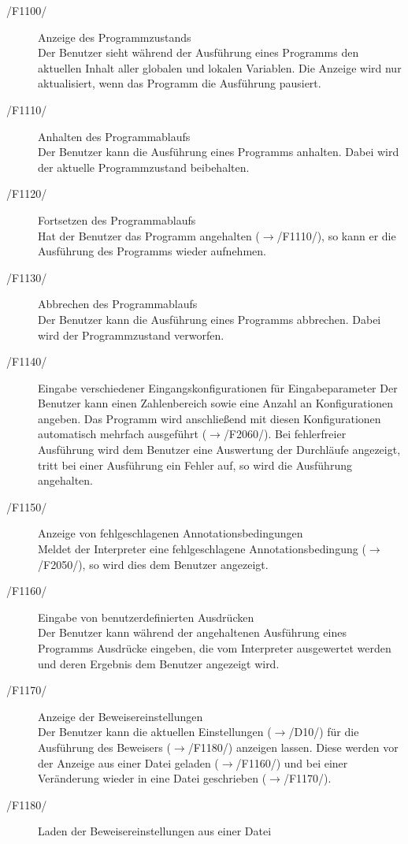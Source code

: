 \documentclass[a4paper,10pt]{article}
\begin{document}
\begin{description}
\item[/F1100/] Anzeige des Programmzustands\\
Der Benutzer sieht w\"{a}hrend der Ausf\"{u}hrung eines Programms den aktuellen Inhalt aller globalen und lokalen Variablen. Die Anzeige wird nur aktualisiert, wenn das Programm die Ausf\"{u}hrung pausiert.
\item[/F1110/] Anhalten des Programmablaufs\\
Der Benutzer kann die Ausf\"{u}hrung eines Programms anhalten. Dabei wird der aktuelle Programmzustand beibehalten.
\item[/F1120/] Fortsetzen des Programmablaufs\\
Hat der Benutzer das Programm angehalten ($\to$/F1110/), so kann er die Ausführung des Programms wieder aufnehmen.
\item[/F1130/] Abbrechen des Programmablaufs\\
Der Benutzer kann die Ausf\"{u}hrung eines Programms abbrechen. Dabei wird der Programmzustand verworfen.
\item[/F1140/] Eingabe verschiedener Eingangskonfigurationen für Eingabeparameter
Der Benutzer kann einen Zahlenbereich sowie eine Anzahl an Konfigurationen angeben. Das Programm wird anschließend mit diesen Konfigurationen automatisch mehrfach ausgeführt ($\to$/F2060/). Bei fehlerfreier Ausführung wird dem Benutzer eine Auswertung der Durchläufe angezeigt, tritt bei einer Ausführung ein Fehler auf, so wird die Ausführung angehalten.
\item[/F1150/] Anzeige von fehlgeschlagenen Annotationsbedingungen\\
Meldet der Interpreter eine fehlgeschlagene Annotationsbedingung ($\to$/F2050/), so wird dies dem Benutzer angezeigt.
\item[/F1160/] Eingabe von benutzerdefinierten Ausdr\"{u}cken\\
Der Benutzer kann w\"{a}hrend der angehaltenen Ausf\"{u}hrung eines Programms Ausdr\"{u}cke eingeben, die vom Interpreter ausgewertet werden und deren Ergebnis dem Benutzer angezeigt wird.
\item[/F1170/] Anzeige der Beweisereinstellungen\\
Der Benutzer kann die aktuellen Einstellungen ($\to$/D10/) f\"{u}r die Ausf\"{u}hrung des Beweisers ($\to$/F1180/) anzeigen lassen. Diese werden vor der Anzeige aus einer Datei geladen ($\to$/F1160/) und bei einer Ver\"{a}nderung wieder in eine Datei geschrieben ($\to$/F1170/).
\item[/F1180/] Laden der Beweisereinstellungen aus einer Datei\\

\end{description}
\end{document}
